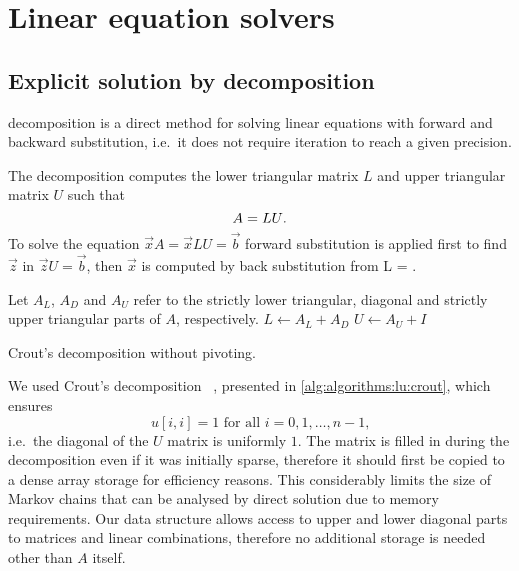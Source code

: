 \section{Linear equation solvers}
\label{sec:algorithms:solvers}

\subsection{Explicit solution by  decomposition}
\label{ssec:algorithms:lu}

 decomposition is a direct method for solving linear
equations with forward and backward substitution, i.e.~it does not
require iteration to reach a given precision.

The decomposition computes the lower triangular matrix $L$ and upper
triangular matrix $U$ such that
\begin{equation}
  A = LU \text.
\end{equation}
To solve the equation $\vec{x} A = \vec{x} LU = \vec{b}$ forward
substitution is applied first to find $\vec{z}$ in
$\vec{z} U = \vec{b}$, then $\vec{x}$ is computed by back substitution
from  L = \text.

\begin{algorithm}
  Let $A_L$, $A_D$ and $A_U$ refer to the strictly lower triangular,
  diagonal and strictly upper triangular parts of $A$, respectively.\;
  $L \gets A_L + A_D$\;
  $U \gets A_U + I$\;
  \;
  \caption{Crout's  decomposition without pivoting.}
  \label{alg:algorithms:lu:crout}
\end{algorithm}

We used Crout's  decomposition%
~\citep[Section~2.3.1]{press2007numerical}, presented in
\vref{alg:algorithms:lu:crout}, which ensures
\begin{equation}
  u[i, i] = 1 \text{ for all $i = 0, 1, \ldots, n - 1$,}
\end{equation}
i.e.~the diagonal of the $U$ matrix is uniformly $1$. The matrix is
filled in during the decomposition even if it was initially sparse,
therefore it should first be copied to a dense array storage for
efficiency reasons. This considerably limits the size of Markov chains that
can be analysed by direct solution due to memory requirements. Our
data structure allows access to upper and lower diagonal parts to
matrices and linear combinations, therefore no additional storage is
needed other than $A$ itself.

